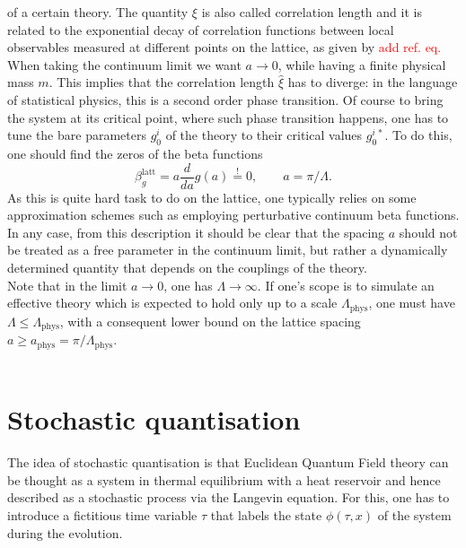 of a certain theory. The quantity $\xi$ is also called correlation length and it is related to the exponential decay of correlation functions between local observables measured
at different points on the lattice, as given by \textcolor{red}{add ref. eq.}\\
When taking the continuum limit we want $a \to 0$, while having a finite physical mass $m$. This implies that the correlation length $\hat \xi$ has to diverge: in the language of statistical physics, this is a second order phase transition. Of course to bring the system at its critical point, where such phase transition happens, one has to tune the bare parameters $g_0^i$ of the theory to their critical values $g_0^{i \, *}$. 
To do this, one should find the zeros of the beta functions
\begin{equation*}
    \beta_g^\text{latt} = a \frac{d}{da} g(a) \overset{!}{=} 0, \qquad a = \pi/\Lambda.
\end{equation*}
As this is quite hard task to do on the lattice, one typically relies on some approximation schemes such as employing perturbative continuum beta functions. \\
In any case, from this description it should be clear that the spacing $a$ should not be treated as a free parameter in the continuum limit, but rather a dynamically determined quantity that depends on the couplings of the theory.\\
Note that in the limit $a \to 0$, one has $\Lambda \to \infty$. If one's scope is to simulate an effective theory which is expected to hold only up to a scale $\Lambda_\text{phys}$, one must have $\Lambda \leq \Lambda_\text{phys}$, with a consequent lower bound on the lattice spacing $a \geq a_\text{phys} = \pi / \Lambda_\text{phys}$. \\ ~

\section{Stochastic quantisation}
\label{sec:stochastic_quantisation}
The idea of stochastic quantisation \cite{ParisiWu,Damgaard1987StochasticQuantization} is that Euclidean Quantum Field theory can be thought as a system in thermal equilibrium with a heat reservoir and hence described as a stochastic process via the Langevin equation. For this, one has to introduce a fictitious time variable $\tau$ that labels the state $\phi(\tau, x)$ of the system 
during the evolution. \\
